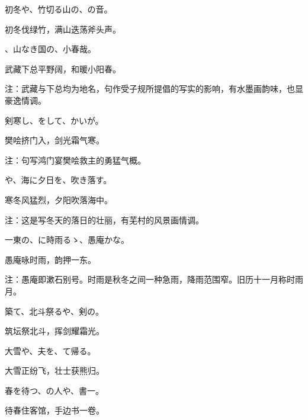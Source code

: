 \setcounter{haikucounter}{0}

\begin{haiku}
    {\FH 初冬や、竹切る山の、の音。}

    {\FK 初冬伐绿竹，满山迭荡斧头声。}
\end{haiku}

\begin{haiku}
    {\FH {}、山なき国の、小春哉。}

    {\FK 武藏下总平野阔，和暖小阳春。}

    {\FT 注：武藏与下总均为地名，句作受子规所提倡的写实的影响，有水墨画韵味，也显豪逸情调。}
\end{haiku}

\begin{haiku}
    {\FH 剣寒し、をして、かいが。}

    {\FK 樊哙挤门入，剑光霜气寒。}

    {\FT 注：句写鸿门宴樊哙救主的勇猛气概。}
\end{haiku}

\begin{haiku}
    {\FH {}や、海に夕日を、吹き落す。}

    {\FK 寒冬风猛烈，夕阳吹落海中。}

    {\FT 注：这是写冬天的落日的壮丽，有芜村的风景画情调。}
\end{haiku}

\begin{haiku}
    {\FH 一東の、に時雨るゝ、愚庵かな。}

    {\FK 愚庵咏时雨，韵押一东。}

    {\FT 注：愚庵即漱石别号。时雨是秋冬之间一种急雨，降雨范围窄。旧历十一月称时雨月。}
\end{haiku}

\begin{haiku}
    {\FH {}築て、北斗祭るや、剣の。}

    {\FK 筑坛祭北斗，挥剑耀霜光。}
\end{haiku}

\begin{haiku}
    {\FH 大雪や、夫を、て帰る。}

    {\FK 大雪正纷飞，壮士获熊归。}
\end{haiku}

\begin{haiku}
    {\FH 春を待つ、の人や、書一。}

    {\FK 待春住客馆，手边书一卷。}
\end{haiku}

